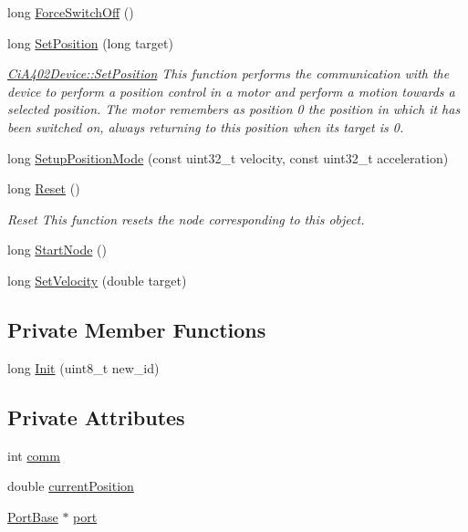 \begin{DoxyCompactItemize}
long \hyperlink{classCiA402Device_aff0503b4caa6d2a8e2e66df6b9e0f4e4}{Force\+Switch\+Off} ()
\item 
long \hyperlink{classCiA402Device_ae2647017d52b074cb8b4800f77ed65b5}{Set\+Position} (long target)
\begin{DoxyCompactList}\small\item\em \hyperlink{classCiA402Device_ae2647017d52b074cb8b4800f77ed65b5}{Ci\+A402\+Device\+::\+Set\+Position} This function performs the communication with the device to perform a position control in a motor and perform a motion towards a selected position. The motor remembers as position 0 the position in which it has been switched on, always returning to this position when its target is 0. \end{DoxyCompactList}\item 
long \hyperlink{classCiA402Device_a221dbc5461823097981727a3baff5d0c}{Setup\+Position\+Mode} (const uint32\+\_\+t velocity, const uint32\+\_\+t acceleration)
\item 
long \hyperlink{classCiA402Device_ac4a6e4987ebe075d0ac07ee5fd4d410c}{Reset} ()
\begin{DoxyCompactList}\small\item\em Reset This function resets the node corresponding to this object. \end{DoxyCompactList}\item 
long \hyperlink{classCiA402Device_a32b4628098364846fe291312025f6fda}{Start\+Node} ()
\item 
long \hyperlink{classCiA402Device_a498224b82a857197eb2d28beddc74729}{Set\+Velocity} (double target)
\end{DoxyCompactItemize}
\subsection*{Private Member Functions}
\begin{DoxyCompactItemize}
\item 
long \hyperlink{classCiA402Device_a622a8884e21d9c4b5ffa0d6c1458ef08}{Init} (uint8\+\_\+t new\+\_\+id)
\end{DoxyCompactItemize}
\subsection*{Private Attributes}
\begin{DoxyCompactItemize}
\item 
int \hyperlink{classCiA402Device_a4e7a5a225fb27f5f02aeb0e6df38cd1f}{comm}
\item 
double \hyperlink{classCiA402Device_adb251ae496aeca707dcc51b43c64d0b8}{current\+Position}
\item 
\hyperlink{classPortBase}{Port\+Base} $\ast$ \hyperlink{classCiA402Device_abc96eb117cc948d86e3bd4c07c7fe807}{port}
\end{DoxyCompactItemize}


